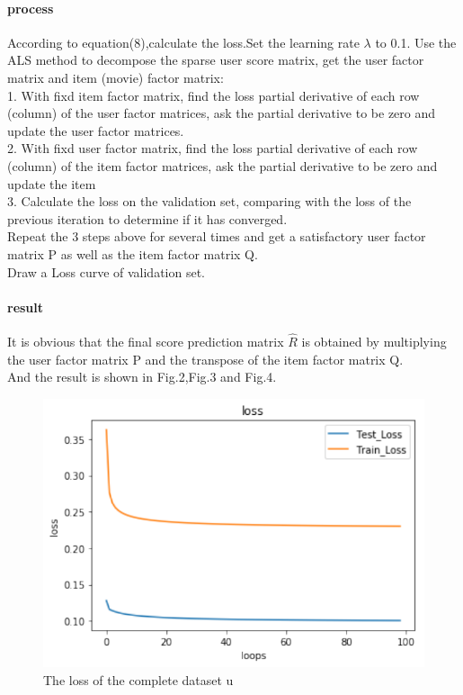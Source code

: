 \documentclass[journal, a4paper]{IEEEtran}
\begin{document}
\paragraph{process}
According to equation(8),calculate the loss.Set the learning rate $\lambda$ to 0.1.
Use the ALS method to decompose the sparse user score matrix, get the user factor matrix and item (movie) factor matrix: \\
1. With fixd item factor matrix, find the loss partial derivative of each row (column) of the user factor matrices, ask the partial derivative to be zero and update the user factor matrices.  \\
2. With fixd user factor matrix, find the loss partial derivative of each row (column) of the item factor matrices, ask the partial derivative to be zero and update the item \\
3. Calculate the loss on the validation set, comparing with the loss of the previous iteration to determine if it has converged.\\
Repeat the 3 steps above for several times and get a satisfactory user factor matrix P as well as the item factor matrix Q.\\
Draw a Loss curve of validation set.
\paragraph{result}
It is obvious that the final score prediction matrix $\hat{R}$ is obtained by multiplying the user factor matrix P and the transpose of the item factor matrix Q.\\
And the result is shown in Fig.2,Fig.3 and Fig.4.

\begin{figure}[!hbt]
		\begin{center}
		\includegraphics[width=\columnwidth]{lab4-loss}
		\caption{The loss of the complete dataset u}
		\label{fig:tf_plot}
		\end{center}
\end{figure}
	
\end{document}
